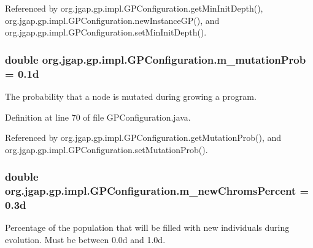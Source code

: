 Referenced by org.\-jgap.\-gp.\-impl.\-G\-P\-Configuration.\-get\-Min\-Init\-Depth(), org.\-jgap.\-gp.\-impl.\-G\-P\-Configuration.\-new\-Instance\-G\-P(), and org.\-jgap.\-gp.\-impl.\-G\-P\-Configuration.\-set\-Min\-Init\-Depth().

\hypertarget{classorg_1_1jgap_1_1gp_1_1impl_1_1_g_p_configuration_a5f72278a7b65171a71d242346d1df037}{
\subsubsection[{m\-\_\-mutation\-Prob}]{\setlength{\rightskip}{0pt plus 5cm}double org.\-jgap.\-gp.\-impl.\-G\-P\-Configuration.\-m\-\_\-mutation\-Prob = 0.\-1d\hspace{0.3cm}{\ttfamily [private]}}}\label{classorg_1_1jgap_1_1gp_1_1impl_1_1_g_p_configuration_a5f72278a7b65171a71d242346d1df037}
The probability that a node is mutated during growing a program. 

Definition at line 70 of file G\-P\-Configuration.\-java.



Referenced by org.\-jgap.\-gp.\-impl.\-G\-P\-Configuration.\-get\-Mutation\-Prob(), and org.\-jgap.\-gp.\-impl.\-G\-P\-Configuration.\-set\-Mutation\-Prob().

\hypertarget{classorg_1_1jgap_1_1gp_1_1impl_1_1_g_p_configuration_a3dc5be9e48cc959bcd8c8eff84c12c62}{
\subsubsection[{m\-\_\-new\-Chroms\-Percent}]{\setlength{\rightskip}{0pt plus 5cm}double org.\-jgap.\-gp.\-impl.\-G\-P\-Configuration.\-m\-\_\-new\-Chroms\-Percent = 0.\-3d\hspace{0.3cm}{\ttfamily [private]}}}\label{classorg_1_1jgap_1_1gp_1_1impl_1_1_g_p_configuration_a3dc5be9e48cc959bcd8c8eff84c12c62}
Percentage of the population that will be filled with new individuals during evolution. Must be between 0.\-0d and 1.\-0d. 

